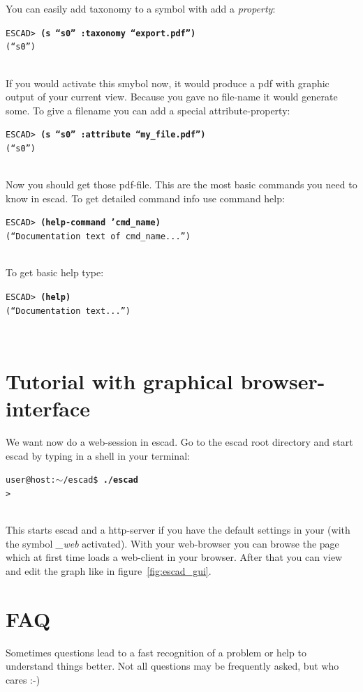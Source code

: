 \documentclass[a4paper, 12pt, openany]{scrbook}
\makeatletter
\newcommand{\shellcmdline}[2]{\\
  \setlength{\fboxsep}{2pt}\colorbox{black!20}{\parbox{\textwidth}{\texttt{user@host:$\sim$/escad\$ \textbf{#1}\\#2}}}\\}
\newcommand{\escadcmdline}[2]{\\\setlength{\fboxsep}{2pt}\colorbox{black!20}{\parbox{\textwidth}{\texttt{ESCAD> \textbf{#1}\\#2}}}\\}
\makeatother
\begin{document}
You can easily add taxonomy to a symbol with add a \emph{property}:
\escadcmdline{(s ``s0'' :taxonomy ``export.pdf'')}{(``s0'')}
If you would activate this smybol now, it would produce a pdf with graphic output of your current view. Because you gave no file-name it would generate some. To give a filename you can add a special attribute-property:
\escadcmdline{(s ``s0'' :attribute ``my\_file.pdf'')}{(``s0'')}
Now you should get those pdf-file.
This are the most basic commands you need to know in escad. To get detailed command info use command help:
\escadcmdline{(help-command 'cmd\_name)}{(``Documentation text of cmd\_name...'')}
To get basic help type:
\escadcmdline{(help)}{(``Documentation text...'')}
\section{Tutorial with graphical browser-interface}
We want now do a web-session in escad. Go to the escad root directory and start escad by typing in a shell in your terminal:
\shellcmdline{./escad}{>}
This starts escad and a http-server if you have the default settings in your  (with the symbol \emph{\_web} activated). With your web-browser you can browse the page which at first time loads a web-client in your browser. After that you can view and edit the graph like in figure~\ref{fig:escad_gui}.
\section{FAQ}
Sometimes questions lead to a fast recognition of a problem or help to understand things better. Not all questions may be frequently asked, but who cares :-)
\end{document}
